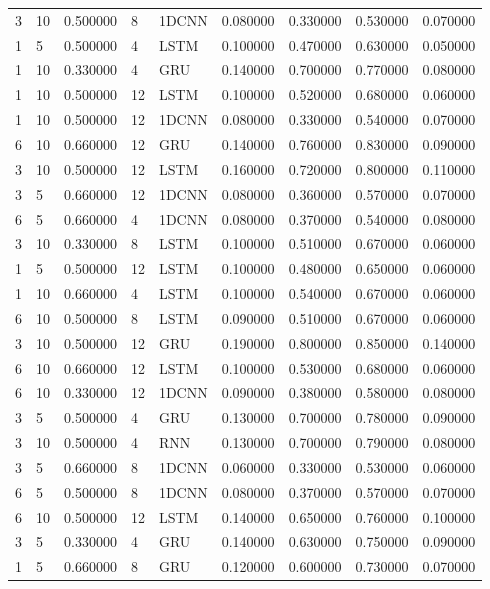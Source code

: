 \begin{tabular}{llrllrrrr}
3 & 10 & 0.500000 & 8 & 1DCNN & 0.080000 & 0.330000 & 0.530000 & 0.070000 \\
1 & 5 & 0.500000 & 4 & LSTM & 0.100000 & 0.470000 & 0.630000 & 0.050000 \\
1 & 10 & 0.330000 & 4 & GRU & 0.140000 & 0.700000 & 0.770000 & 0.080000 \\
1 & 10 & 0.500000 & 12 & LSTM & 0.100000 & 0.520000 & 0.680000 & 0.060000 \\
1 & 10 & 0.500000 & 12 & 1DCNN & 0.080000 & 0.330000 & 0.540000 & 0.070000 \\
6 & 10 & 0.660000 & 12 & GRU & 0.140000 & 0.760000 & 0.830000 & 0.090000 \\
3 & 10 & 0.500000 & 12 & LSTM & 0.160000 & 0.720000 & 0.800000 & 0.110000 \\
3 & 5 & 0.660000 & 12 & 1DCNN & 0.080000 & 0.360000 & 0.570000 & 0.070000 \\
6 & 5 & 0.660000 & 4 & 1DCNN & 0.080000 & 0.370000 & 0.540000 & 0.080000 \\
3 & 10 & 0.330000 & 8 & LSTM & 0.100000 & 0.510000 & 0.670000 & 0.060000 \\
1 & 5 & 0.500000 & 12 & LSTM & 0.100000 & 0.480000 & 0.650000 & 0.060000 \\
1 & 10 & 0.660000 & 4 & LSTM & 0.100000 & 0.540000 & 0.670000 & 0.060000 \\
6 & 10 & 0.500000 & 8 & LSTM & 0.090000 & 0.510000 & 0.670000 & 0.060000 \\
3 & 10 & 0.500000 & 12 & GRU & 0.190000 & 0.800000 & 0.850000 & 0.140000 \\
6 & 10 & 0.660000 & 12 & LSTM & 0.100000 & 0.530000 & 0.680000 & 0.060000 \\
6 & 10 & 0.330000 & 12 & 1DCNN & 0.090000 & 0.380000 & 0.580000 & 0.080000 \\
3 & 5 & 0.500000 & 4 & GRU & 0.130000 & 0.700000 & 0.780000 & 0.090000 \\
3 & 10 & 0.500000 & 4 & RNN & 0.130000 & 0.700000 & 0.790000 & 0.080000 \\
3 & 5 & 0.660000 & 8 & 1DCNN & 0.060000 & 0.330000 & 0.530000 & 0.060000 \\
6 & 5 & 0.500000 & 8 & 1DCNN & 0.080000 & 0.370000 & 0.570000 & 0.070000 \\
6 & 10 & 0.500000 & 12 & LSTM & 0.140000 & 0.650000 & 0.760000 & 0.100000 \\
3 & 5 & 0.330000 & 4 & GRU & 0.140000 & 0.630000 & 0.750000 & 0.090000 \\
1 & 5 & 0.660000 & 8 & GRU & 0.120000 & 0.600000 & 0.730000 & 0.070000 \\

\end{tabular}
